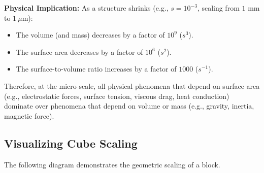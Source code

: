 \documentclass[12pt,a4paper]{article}
\begin{document}
\textbf{Physical Implication:}
As a structure shrinks (e.g., $s = 10^{-3}$, scaling from $1\text{ mm}$ to $1\ \mu\text{m}$):
\begin{itemize}[leftmargin=*, itemsep=2.5pt]
  \item The volume (and mass) decreases by a factor of $10^9$ ($s^3$).
  \item The surface area decreases by a factor of $10^6$ ($s^2$).
  \item The surface-to-volume ratio increases by a factor of $1000$ ($s^{-1}$).
\end{itemize}
Therefore, at the micro-scale, all physical phenomena that depend on surface area (e.g., electrostatic forces, surface tension, viscous drag, heat conduction) dominate over phenomena that depend on volume or mass (e.g., gravity, inertia, magnetic force).

\subsection{Visualizing Cube Scaling}
The following diagram demonstrates the geometric scaling of a block.
\end{document}
